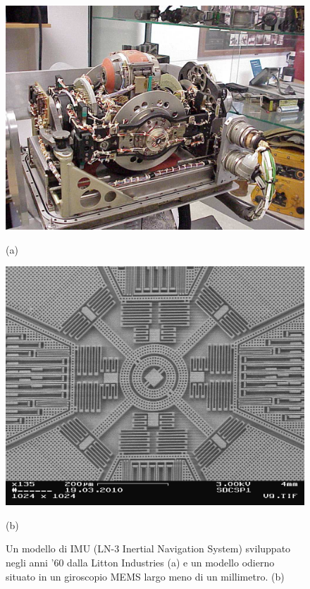 \begin{figure}[H]
	\centering
	\begin{minipage}[b]{0.49\textwidth}
		\includegraphics[width=\textwidth]{figure/oldIMU}
		{\footnotesize \centerline{(a)} \par}
	\end{minipage}
	\hfill
	\begin{minipage}[b]{0.46\textwidth}
		\includegraphics[width=\textwidth]{figure/IMU}
		{\footnotesize \centerline{(b)} \par}
	\end{minipage}
	\caption{Un modello di IMU (LN-3 Inertial Navigation System) sviluppato negli anni '60 dalla Litton Industries (a) e un modello odierno situato in un giroscopio MEMS largo meno di un millimetro. (b)}
\end{figure}

